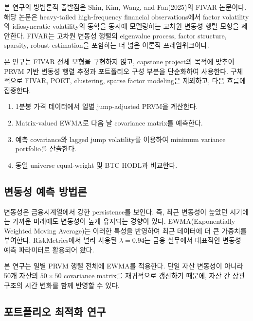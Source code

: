 \documentclass[12pt,a4paper]{article}
\begin{document}
본 연구의 방법론적 출발점은 Shin, Kim, Wang, and Fan(2025)의 FIVAR 논문이다. 해당 논문은 heavy-tailed high-frequency financial observations에서 factor volatility와 idiosyncratic volatility의 동학을 동시에 모델링하는 고차원 변동성 행렬 모형을 제안한다. FIVAR는 고차원 변동성 행렬의 eigenvalue process, factor structure, sparsity, robust estimation을 포함하는 더 넓은 이론적 프레임워크이다.

본 연구는 FIVAR 전체 모형을 구현하지 않고, capstone project의 목적에 맞추어 PRVM 기반 변동성 행렬 추정과 포트폴리오 구성 부분을 단순화하여 사용한다. 구체적으로 FIVAR, POET, clustering, sparse factor modeling은 제외하고, 다음 흐름에 집중한다.

\begin{enumerate}
\item 1분봉 가격 데이터에서 일별 jump-adjusted PRVM을 계산한다.
\item Matrix-valued EWMA로 다음 날 covariance matrix를 예측한다.
\item 예측 covariance와 lagged jump volatility를 이용하여 minimum variance portfolio를 산출한다.
\item 동일 universe equal-weight 및 BTC HODL과 비교한다.
\end{enumerate}


\subsection{변동성 예측 방법론}

변동성은 금융시계열에서 강한 persistence를 보인다. 즉, 최근 변동성이 높았던 시기에는 가까운 미래에도 변동성이 높게 유지되는 경향이 있다. EWMA(Exponentially Weighted Moving Average)는 이러한 특성을 반영하여 최근 데이터에 더 큰 가중치를 부여한다. RiskMetrics에서 널리 사용된 $\lambda = 0.94$는 금융 실무에서 대표적인 변동성 예측 파라미터로 활용되어 왔다.

본 연구는 일별 PRVM 행렬 전체에 EWMA를 적용한다. 단일 자산 변동성이 아니라 50개 자산의 $50 \times 50$ covariance matrix를 재귀적으로 갱신하기 때문에, 자산 간 상관구조의 시간 변화를 함께 반영할 수 있다.

\subsection{포트폴리오 최적화 연구}
\end{document}
